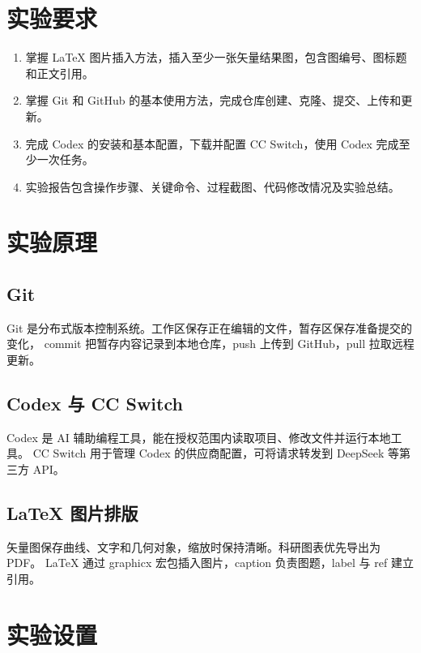\documentclass{SYSUReport}
\date{2026 年 9 月 24 日}
\begin{document}
\cover
\thispagestyle{empty}
\clearpage

\tableofcontents
\clearpage

\setcounter{page}{1}

\section{实验要求}

\begin{enumerate}
  \item 掌握 LaTeX 图片插入方法，插入至少一张矢量结果图，包含图编号、图标题和正文引用。
  \item 掌握 Git 和 GitHub 的基本使用方法，完成仓库创建、克隆、提交、上传和更新。
  \item 完成 Codex 的安装和基本配置，下载并配置 CC Switch，使用 Codex 完成至少一次任务。
  \item 实验报告包含操作步骤、关键命令、过程截图、代码修改情况及实验总结。
\end{enumerate}

\section{实验原理}

\subsection{Git}
Git 是分布式版本控制系统。工作区保存正在编辑的文件，暂存区保存准备提交的变化，
commit 把暂存内容记录到本地仓库，push 上传到 GitHub，pull 拉取远程更新。

\subsection{Codex 与 CC Switch}
Codex 是 AI 辅助编程工具，能在授权范围内读取项目、修改文件并运行本地工具。
CC Switch 用于管理 Codex 的供应商配置，可将请求转发到 DeepSeek 等第三方 API。

\subsection{LaTeX 图片排版}
矢量图保存曲线、文字和几何对象，缩放时保持清晰。科研图表优先导出为 PDF。
LaTeX 通过 graphicx 宏包插入图片，caption 负责图题，label 与 ref 建立引用。

\section{实验设置}
\end{document}
